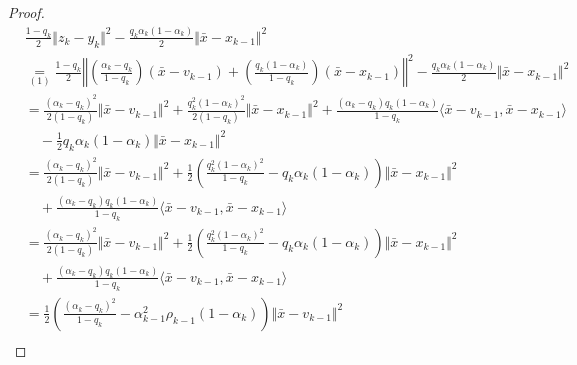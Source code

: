 \documentclass[12pt]{article}
\begin{document}
\begin{proof}
{\begin{align*}
                & \frac{1 - q_k}{2}\Vert z_k - y_k\Vert^2
                - \frac{q_k\alpha_k(1 - \alpha_k)}{2}\Vert \bar x - x_{k - 1}\Vert^2
                \\
                &\underset{(1)}{=}
                \frac{1 - q_k}{2}
                \left\Vert
                    \left(
                    \frac{\alpha_k - q_k}{1 - q_k}
                    \right)(\bar x - v_{k - 1})
                    + \left(
                        \frac{q_k(1 - \alpha_k)}{1 - q_k}
                    \right)\left(
                        \bar x - x_{k - 1}
                    \right)
                \right\Vert^2
                - \frac{q_k\alpha_k(1 - \alpha_k)}{2}\Vert \bar x - x_{k - 1}\Vert^2
                \\
                &= 
                \frac{(\alpha_k - q_k)^2}{2(1 - q_k)}\Vert \bar x - v_{k - 1}\Vert^2
                + \frac{q_k^2(1 - \alpha_k)^2}{2(1 - q_k)}\Vert \bar x - x_{k - 1}\Vert^2
                + \frac{(\alpha_k - q_k)q_k(1 - \alpha_k)}{1 - q_k}\langle \bar x - v_{k - 1}, \bar x - x_{k - 1}\rangle
                    \\&\quad 
                    - \frac{1}{2}q_k \alpha_k(1 - \alpha_k)\Vert \bar x - x_{k - 1}\Vert^2
                \\
                &= \frac{(\alpha_k - q_k)^2}{2(1 - q_k)}\Vert \bar x - v_{k - 1}\Vert^2
                + \frac{1}{2}\left(
                    \frac{q_k^2(1 - \alpha_k)^2}{1 - q_k} - q_k \alpha_k(1 - \alpha_k)
                \right)\Vert \bar x - x_{k - 1}\Vert^2
                    \\ &\quad 
                    + \frac{(\alpha_k - q_k)q_k(1 - \alpha_k)}{1 - q_k}\langle \bar x - v_{k - 1}, \bar x - x_{k - 1}\rangle
                \\
                &= \frac{(\alpha_k - q_k)^2}{2(1 - q_k)}\Vert \bar x - v_{k - 1}\Vert^2
                + \frac{1}{2}\left(
                    \frac{q_k^2(1 - \alpha_k)^2}{1 - q_k} - q_k \alpha_k(1 - \alpha_k)
                \right)\Vert \bar x - x_{k - 1}\Vert^2
                    \\ &\quad 
                    + \frac{(\alpha_k - q_k)q_k(1 - \alpha_k)}{1 - q_k}\langle \bar x - v_{k - 1}, \bar x - x_{k - 1}\rangle
                \\
                &= 
                \frac{1}{2}\left(
                    \frac{(\alpha_k - q_k)^2}{1 - q_k}
                    - \alpha_{k - 1}^2 \rho_{k - 1}(1 - \alpha_k)
                \right)\Vert \bar x - v_{k - 1}\Vert^2
                    \\&\quad

\end{align*}}
\end{proof}
\end{document}
